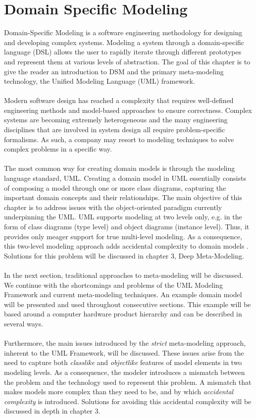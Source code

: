\chapter{Domain Specific Modeling}

Domain-Specific Modeling is a software engineering methodology for designing and developing complex systems. Modeling a system through a domain-specific language (DSL) allows the user to rapidly iterate through different prototypes and represent them at various levels of abstraction. The goal of this chapter is to give the reader an introduction to DSM and the primary meta-modeling technology, the Unified Modeling Language (UML) framework. 
\\ \\
Modern software design has reached a complexity that requires well-defined engineering methods and model-based approaches to ensure correctness. Complex systems are becoming extremely heterogeneous and the many engineering disciplines that are involved in system design all require problem-specific formalisms. As such, a company may resort to modeling techniques to solve complex problems in a specific way.
\\ \\
The most common way for creating domain models is through the modeling language standard, UML. Creating a domain model in UML essentially consists of composing a model through one or more class diagrams, capturing the important domain concepts and their relationships. The main objective of this chapter is to address issues with the object-oriented paradigm currently underpinning the UML. UML supports modeling at two levels only, e.g. in the form of class diagrams (type level) and object diagrams (instance level). Thus, it provides only meager support for true multi-level modeling. As a consequence, this two-level modeling approach adds accidental complexity to domain models \cite{AccidentalComplexity}. Solutions for this problem will be discussed in chapter 3, Deep Meta-Modeling.
\\ \\
In the next section, traditional approaches to meta-modeling will be discussed. We continue with the shortcomings and problems of the UML Modeling Framework and current meta-modeling techniques. An example domain model will be presented and used throughout consecutive sections. This example will be based around a computer hardware product hierarchy and can be described in several ways.
\\ \\
Furthermore, the main issues introduced by the \textit{strict} meta-modeling approach, inherent to the UML Framework, will be discussed. These issues arise from the need to capture both \textit{classlike} and \textit{objectlike} features of model elements in two modeling levels. As a consequence, the modeler introduces a mismatch between the problem and the technology used to represent this problem. A mismatch that makes models more complex than they need to be, and by which \textit{accidental complexity} is introduced. Solutions for avoiding this accidental complexity will be discussed in depth in chapter 3.

